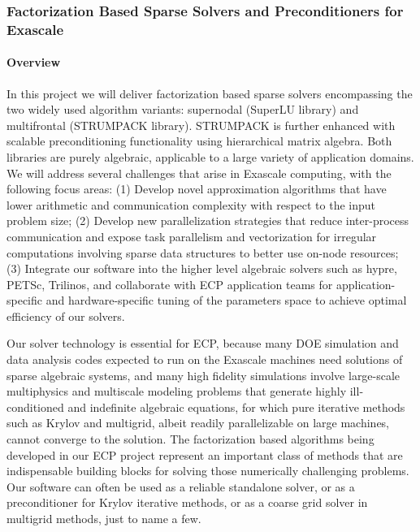 \subsubsection{ Factorization Based Sparse Solvers and Preconditioners for Exascale} \label{subsubsect:strumpack}

\paragraph{Overview} 
In this project we will deliver factorization based sparse solvers
encompassing the two widely used algorithm variants: supernodal
(SuperLU library) and multifrontal (STRUMPACK library). STRUMPACK is
further enhanced with scalable preconditioning functionality using
hierarchical matrix algebra. Both libraries are purely algebraic,
applicable to a large variety of application domains. We will address
several challenges that arise in Exascale computing, with the following
focus areas: 
(1) Develop novel approximation algorithms that have lower
arithmetic and communication complexity with respect to the input
problem size;
(2) Develop new parallelization strategies that reduce
inter-process communication and expose task parallelism and vectorization
for irregular computations involving sparse data structures to better
use on-node resources;
(3) Integrate our software into the higher level
algebraic solvers such as hypre, PETSc, Trilinos, and collaborate with
ECP application teams for application-specific and hardware-specific tuning
of the parameters space to achieve optimal efficiency of our solvers.

Our solver technology is essential for ECP, because many DOE simulation
and data analysis codes expected to run on the Exascale machines need
solutions of sparse algebraic systems, and many high fidelity simulations
involve large-scale multiphysics and multiscale modeling problems that
generate highly ill-conditioned and indefinite algebraic equations,
for which pure iterative methods such as Krylov and multigrid, albeit
readily parallelizable on large machines, cannot converge to the solution.
The factorization based algorithms being developed in our ECP project
represent an important class of methods that are indispensable building
blocks for solving those numerically challenging problems. Our software
can often be used as a reliable standalone solver, or as a preconditioner
for Krylov iterative methods, or as a coarse grid solver in multigrid
methods, just to name a few.


